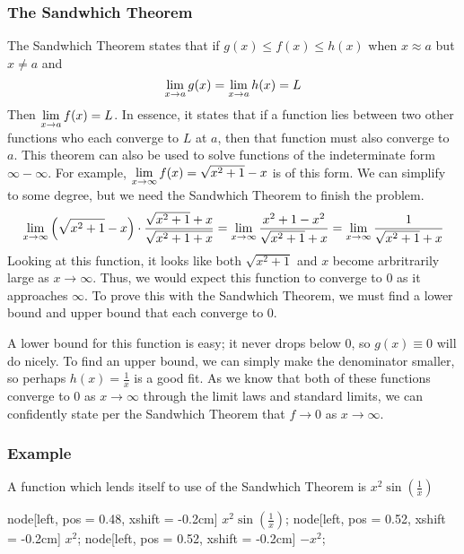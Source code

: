 \documentclass[12pt]{report}
\begin{document}
\begin{flushleft}
\subsubsection*{The Sandwhich Theorem}
The Sandwhich Theorem states that if \(g(x) \leq f(x) \leq h(x)\) when 
\(x \approx a\) but \(x \neq a\) and
\[\lim\limits_{x\rightarrow a}g(x) = \lim\limits_{x\rightarrow a}h(x) = L\]
Then \(\lim\limits_{x\rightarrow a}f(x) = L\). In essence, it states that if a 
function lies between two other functions who each converge to \(L\) at \(a\),
then that function must also converge to \(a\). This theorem can also be used
to solve functions of the indeterminate form \(\infty - \infty\). For example,
\(\lim\limits_{x\rightarrow\infty} f(x) = \sqrt{x^2 + 1} - x\) is of this form. We
can simplify to some degree, but we need the Sandwhich Theorem to finish the 
problem.
\[\lim\limits_{x\rightarrow\infty} \left(\sqrt{x^2 + 1} - x\right) \cdot 
\frac{\sqrt{x^2 + 1} + x}{\sqrt{x^2 + 1 + x}} 
= \lim\limits_{x\rightarrow\infty} \frac{x^2 + 1 - x^2}{\sqrt{x^2 + 1} + x} 
= \lim\limits_{x\rightarrow\infty} \frac{1}{\sqrt{x^2 + 1} + x}\]
Looking at this function, it looks like both \(\sqrt{x^2 + 1}\) and \(x\) 
become arbritrarily large as \(x\rightarrow\infty\). Thus, we would expect this
function to converge to \(0\) as it approaches \(\infty\). To prove this with 
the Sandwhich Theorem, we must find a lower bound and upper bound that each 
converge to \(0\). \par
A lower bound for this function is easy; it never drops below \(0\), so 
\(g(x)\equiv0\) will do nicely. To find an upper bound, we can simply make the 
denominator smaller, so perhaps \(h(x) = \frac{1}{x}\) is a good fit. As we
know that both of these functions converge to \(0\) as \(x\rightarrow\infty\)
through the limit laws and standard limits, we can confidently state per the
Sandwhich Theorem that \(f\rightarrow0\) as \(x\rightarrow\infty\).

\subsubsection*{Example}
A function which lends itself to use of the Sandwhich Theorem is 
\(x^2\sin(\frac{1}{x})\)

\begin{plot}[
    xmax = 0.5,
    xmin = -0.5,
    ymax = 0.2,
    ymin = -0.2
]
    node[left, pos = 0.48, xshift = -0.2cm] 
    {\(x^2\sin\left(\frac{1}{x}\right)\)};
    node[left, pos = 0.52, xshift = -0.2cm] {\(x^2\)};
    node[left, pos = 0.52, xshift = -0.2cm] {\(-x^2\)};
\end{plot}


\end{flushleft}
\end{document}
